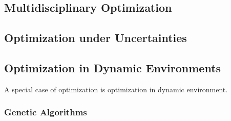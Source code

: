 \subsection{Multidisciplinary Optimization}

\subsection{Optimization under Uncertainties}

\subsection{Optimization in Dynamic Environments}
A special case of optimization is optimization in dynamic environment.

\subsubsection{Genetic Algorithms}



